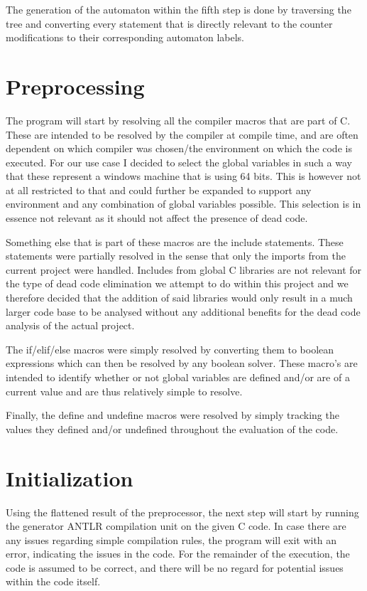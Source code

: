 \documentclass[12pt]{thesis}
\begin{document}
The generation of the automaton within the fifth step is done by traversing the tree and converting every statement that is directly relevant to the counter modifications to their corresponding automaton labels.

\section{Preprocessing}
\label{sec:conversion}
The program will start by resolving all the compiler macros that are part of C. These are intended to be resolved by the compiler at compile time, and are often dependent on which compiler was chosen/the environment on which the code is executed. For our use case I decided to select the global variables in such a way that these represent a windows machine that is using 64 bits. This is however not at all restricted to that and could further be expanded to support any environment and any combination of global variables possible. This selection is in essence not relevant as it should not affect the presence of dead code.

Something else that is part of these macros are the include statements. These statements were partially resolved in the sense that only the imports from the current project were handled. Includes from global C libraries are not relevant for the type of dead code elimination we attempt to do within this project and we therefore decided that the addition of said libraries would only result in a much larger code base to be analysed without any additional benefits for the dead code analysis of the actual project.

The if/elif/else macros were simply resolved by converting them to boolean expressions which can then be resolved by any boolean solver. These macro's are intended to identify whether or not global variables are defined and/or are of a current value and are thus relatively simple to resolve.

Finally, the define and undefine macros were resolved by simply tracking the values they defined and/or undefined throughout the evaluation of the code. 

\section{Initialization}
Using the flattened result of the preprocessor, the next step will start by running the generator ANTLR compilation unit on the given C code. In case there are any issues regarding simple compilation rules, the program will exit with an error, indicating the issues in the code. For the remainder of the execution, the code is assumed to be correct, and there will be no regard for potential issues within the code itself.
\end{document}
